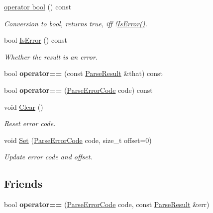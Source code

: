 \begin{DoxyCompactItemize}
\mbox{\label{a02188_a4cec9590497f982dec42e9f0763d5d73}} 
\hyperlink{a02188_a4cec9590497f982dec42e9f0763d5d73}{operator bool} () const
\begin{DoxyCompactList}\small\item\em Conversion to {\ttfamily bool}, returns {\ttfamily true}, iff !\hyperlink{a02188_adfe0ef5b994e82f8aa9ebf0b30c924b1}{Is\+Error()}. \end{DoxyCompactList}\item 
\mbox{\label{a02188_adfe0ef5b994e82f8aa9ebf0b30c924b1}} 
bool \hyperlink{a02188_adfe0ef5b994e82f8aa9ebf0b30c924b1}{Is\+Error} () const
\begin{DoxyCompactList}\small\item\em Whether the result is an error. \end{DoxyCompactList}\item 
\mbox{\label{a02188_a4d98465a5dc6055e367a7ea7089fc73d}} 
bool {\bfseries operator==} (const \hyperlink{a02188}{Parse\+Result} \&that) const
\item 
\mbox{\label{a02188_a6de18a7e43013b2defc51d892c2cf90f}} 
bool {\bfseries operator==} (\hyperlink{a00635_ga8d4b32dfc45840bca189ade2bbcb6ba7}{Parse\+Error\+Code} code) const
\item 
\mbox{\label{a02188_a88b6d44f052a19e6436ae6aadc2c40b4}} 
void \hyperlink{a02188_a88b6d44f052a19e6436ae6aadc2c40b4}{Clear} ()
\begin{DoxyCompactList}\small\item\em Reset error code. \end{DoxyCompactList}\item 
\mbox{\label{a02188_aa81b4a7b776b77216cb752385203a8c1}} 
void \hyperlink{a02188_aa81b4a7b776b77216cb752385203a8c1}{Set} (\hyperlink{a00635_ga8d4b32dfc45840bca189ade2bbcb6ba7}{Parse\+Error\+Code} code, size\+\_\+t offset=0)
\begin{DoxyCompactList}\small\item\em Update error code and offset. \end{DoxyCompactList}\end{DoxyCompactItemize}
\subsection*{Friends}
\begin{DoxyCompactItemize}
\item 
\mbox{\label{a02188_a58c9982e833d1c74686506ac7449200c}} 
bool {\bfseries operator==} (\hyperlink{a00635_ga8d4b32dfc45840bca189ade2bbcb6ba7}{Parse\+Error\+Code} code, const \hyperlink{a02188}{Parse\+Result} \&err)
\end{DoxyCompactItemize}


